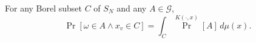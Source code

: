 For any Borel subset $C$ of $S_N$ and any $A \in \mathcal{G}$,
$$\Pr[\omega \in A \land x_v \in C] = \int_C \Pr^{K(\cdot, x)}[A] \, d\mu(x).$$
